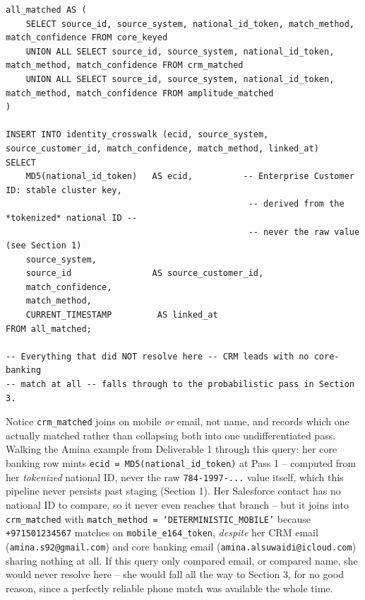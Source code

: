 \documentclass[11pt]{article}
\begin{document}
\begin{lstlisting}[language=PseudoSQL, style=codeblock]
all_matched AS (
    SELECT source_id, source_system, national_id_token, match_method, match_confidence FROM core_keyed
    UNION ALL SELECT source_id, source_system, national_id_token, match_method, match_confidence FROM crm_matched
    UNION ALL SELECT source_id, source_system, national_id_token, match_method, match_confidence FROM amplitude_matched
)

INSERT INTO identity_crosswalk (ecid, source_system, source_customer_id, match_confidence, match_method, linked_at)
SELECT
    MD5(national_id_token)   AS ecid,          -- Enterprise Customer ID: stable cluster key,
                                                -- derived from the *tokenized* national ID --
                                                -- never the raw value (see Section 1)
    source_system,
    source_id                AS source_customer_id,
    match_confidence,
    match_method,
    CURRENT_TIMESTAMP         AS linked_at
FROM all_matched;

-- Everything that did NOT resolve here -- CRM leads with no core-banking
-- match at all -- falls through to the probabilistic pass in Section 3.
\end{lstlisting}

\begin{rationale}
Notice \texttt{crm\_matched} joins on mobile \emph{or} email, not name, and records which one actually matched rather than collapsing both into one undifferentiated pass. Walking the Amina example from Deliverable 1 through this query: her core banking row mints \texttt{ecid = MD5(national\_id\_token)} at Pass 1 -- computed from her \emph{tokenized} national ID, never the raw \texttt{784-1997-...} value itself, which this pipeline never persists past staging (Section 1). Her Salesforce contact has no national ID to compare, so it never even reaches that branch -- but it joins into \texttt{crm\_matched} with \texttt{match\_method = `DETERMINISTIC\_MOBILE'} because \texttt{+971501234567} matches on \texttt{mobile\_e164\_token}, \emph{despite} her CRM email (\texttt{amina.s92@gmail.com}) and core banking email (\texttt{amina.alsuwaidi@icloud.com}) sharing nothing at all. If this query only compared email, or compared name, she would never resolve here -- she would fall all the way to Section 3, for no good reason, since a perfectly reliable phone match was available the whole time.
\end{rationale}
\end{document}
